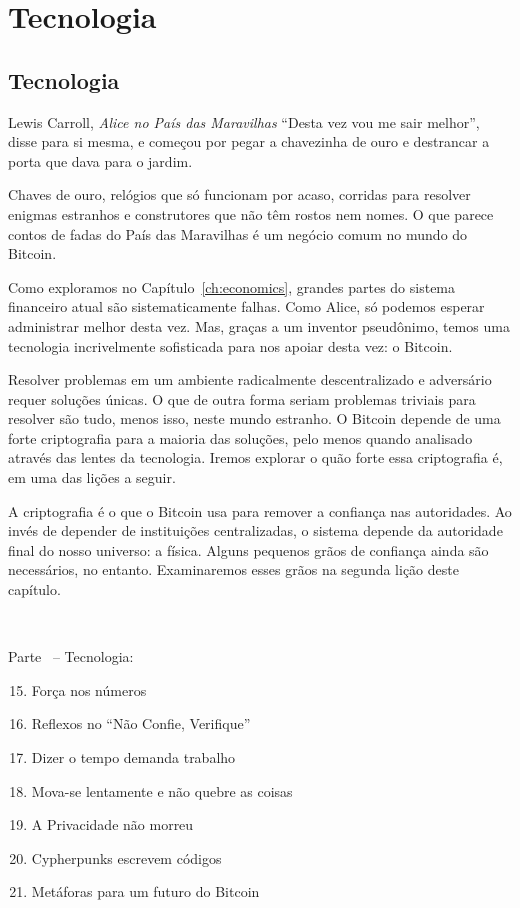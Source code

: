 \part{Tecnologia}
\label{ch:technology}
\chapter*{Tecnologia}

\begin{chapquote}{Lewis Carroll, \textit{Alice no País das Maravilhas}}
\enquote{Desta vez vou me sair melhor}, disse para si mesma, e começou por pegar a chavezinha de ouro e destrancar a porta que dava para o jardim.
\end{chapquote}

Chaves de ouro, relógios que só funcionam por acaso, corridas para resolver enigmas estranhos e construtores que não têm rostos nem nomes. O que parece contos de fadas do País das Maravilhas é um negócio comum no mundo do Bitcoin.

Como exploramos no Capítulo~\ref{ch:economics}, grandes partes do sistema financeiro atual são sistematicamente falhas. Como Alice, só podemos esperar administrar melhor desta vez. Mas, graças a um inventor pseudônimo, temos uma tecnologia incrivelmente sofisticada para nos apoiar desta vez: o Bitcoin.

Resolver problemas em um ambiente radicalmente descentralizado e adversário requer soluções únicas. O que de outra forma seriam problemas triviais para resolver são tudo, menos isso, neste mundo estranho. O Bitcoin depende de uma forte criptografia para a maioria das soluções, pelo menos quando analisado através das lentes da tecnologia. Iremos explorar o quão forte essa criptografia é, em uma das lições a seguir.

A criptografia é o que o Bitcoin usa para remover a confiança nas autoridades. Ao invés de depender de instituições centralizadas, o sistema depende da autoridade final do nosso universo: a física. Alguns pequenos grãos de confiança ainda são necessários, no entanto. Examinaremos esses grãos na segunda lição deste capítulo.

~

\begin{samepage}
Parte~\ref{ch:technology} -- Tecnologia:

\begin{enumerate}
  \setcounter{enumi}{14}
  \item Força nos números
  \item Reflexos no \enquote{Não Confie, Verifique}
  \item Dizer o tempo demanda trabalho
  \item Mova-se lentamente e não quebre as coisas
  \item A Privacidade não morreu
  \item Cypherpunks escrevem códigos
  \item Metáforas para um futuro do Bitcoin
\end{enumerate}
\end{samepage}


